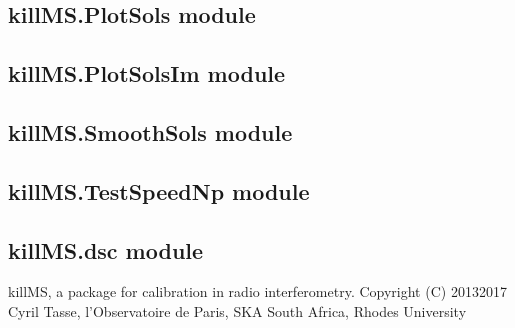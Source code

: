 \documentclass[letterpaper,10pt,english]{sphinxmanual}
\begin{document}

\begin{fulllineitems}
\label{\detokenize{api/killMS:killMS.MergeSols.read_options}}
\pysigstartsignatures
{}
\pysigstopsignatures
\end{fulllineitems}


\begin{fulllineitems}
\label{\detokenize{api/killMS:killMS.MergeSols.test}}
\pysigstartsignatures
{}
\pysigstopsignatures
\end{fulllineitems}



\subsection{killMS.PlotSols module}
\label{\detokenize{api/killMS:killms-plotsols-module}}

\subsection{killMS.PlotSolsIm module}
\label{\detokenize{api/killMS:killms-plotsolsim-module}}

\subsection{killMS.SmoothSols module}
\label{\detokenize{api/killMS:killms-smoothsols-module}}

\subsection{killMS.TestSpeedNp module}
\label{\detokenize{api/killMS:killms-testspeednp-module}}

\subsection{killMS.dsc module}
\label{\detokenize{api/killMS:module-killMS.dsc}}\label{\detokenize{api/killMS:killms-dsc-module}}
\sphinxAtStartPar
killMS, a package for calibration in radio interferometry.
Copyright (C) 2013\sphinxhyphen{}2017  Cyril Tasse, l’Observatoire de Paris,
SKA South Africa, Rhodes University
\end{document}
